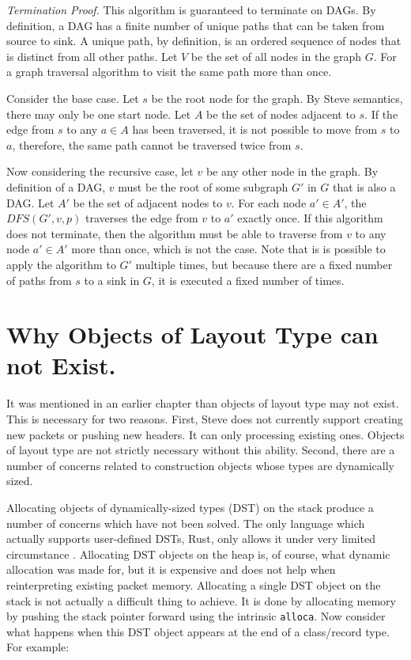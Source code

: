 \textit{Termination Proof.} This algorithm is guaranteed to terminate on DAGs. By definition, a DAG has a finite number of unique paths that can be taken from source to sink. A unique path, by definition, is an ordered sequence of nodes that is distinct from all other paths.
Let $V$ be the set of all nodes in the graph $G$.
For a graph traversal algorithm to visit the same path more than once.

Consider the base case.
Let $s$ be the root node for the graph. By Steve semantics, there may only be one start node. Let $A$ be the set of nodes adjacent to $s$. If the edge from $s$ to any $a \in A$ has been traversed, it is not possible to move from $s$ to $a$, therefore, the same path cannot be traversed twice from $s$.

Now considering the recursive case, let $v$ be any other node in the graph. By definition of a DAG, $v$ must be the root of some subgraph $G'$ in $G$ that is also a DAG. Let $A'$ be the set of adjacent nodes to $v$. For each node $a' \in A'$, the $DFS(G',v, p)$ traverses the edge from $v$ to $a'$ exactly once. If this algorithm does not terminate, then the algorithm must be able to traverse from $v$ to any node $a' \in A'$ more than once, which is not the case. Note that is is possible to apply the algorithm to $G'$ multiple times, but because there are a fixed number of paths from $s$ to a sink in $G$, it is executed a fixed number of times.

\section{Why Objects of Layout Type can not Exist.} \label{guide:no_dst}

It was mentioned in an earlier chapter than objects of layout type may not exist.
This is necessary for two reasons.
First, Steve does not currently support creating new packets or pushing new headers. 
It can only processing existing ones. 
Objects of layout type are not strictly necessary without this ability.
Second, there are a number of concerns related to construction objects whose
types are dynamically sized.

Allocating objects of dynamically-sized types (DST) on the stack produce a number of concerns which have not been solved.
The only language which actually supports user-defined DSTs, Rust, only allows it under 
very limited circumstance \cite{rust_dst_std}.
Allocating DST objects on the heap is, of course, what dynamic allocation was made for, but
it is expensive and does not help when reinterpreting existing packet memory.
Allocating a single DST object on the stack is not actually a difficult thing to achieve. 
It is done by allocating memory by pushing the stack pointer forward using the intrinsic
\texttt{alloca}. 
Now consider what happens when this DST object appears at the end of a class/record
type. For example:


